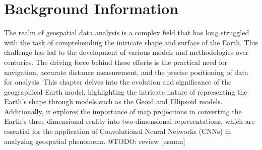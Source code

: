 
\clearpage
\cleardoublepage

\chapter{Background Information}
\label{chap:background_information}
The realm of geospatial data analysis is a complex field that has long struggled with the task of comprehending the intricate shape and surface of the Earth.
This challenge has led to the development of various models and methodologies over centuries. The driving force behind these efforts is the practical need for navigation,
accurate distance measurement, and the precise positioning of data for analysis. This chapter delves into the evolution and significance of the geographical Earth model,
highlighting the intricate nature of representing the Earth's shape through models such as the Geoid and Ellipsoid models. Additionally, it explores the importance of
map projections in converting the Earth's three-dimensional reality into two-dimensional representations, which are essential for the application of
Convolutional Neural Networks (CNNs) in analyzing geospatial phenomena.
@TODO: review [usman]



\clearpage
